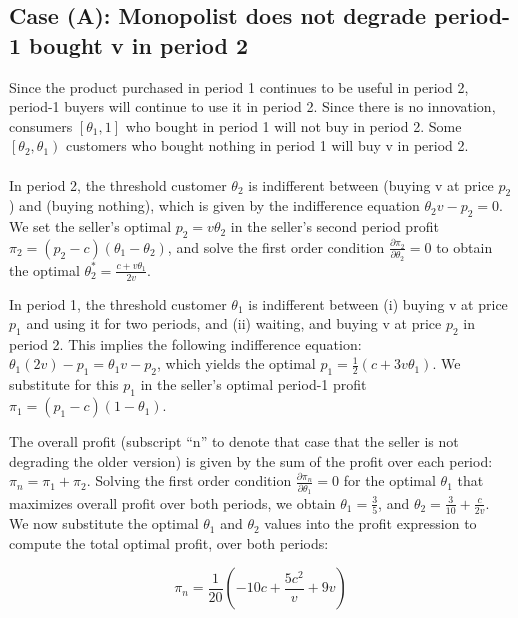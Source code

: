 \documentclass{article}
\begin{document}
\subsection*{Case (A): Monopolist does not degrade period-1 bought v in period 2}

Since the product purchased in period 1 continues to be useful in period 2, period-1 buyers will continue to use it in period 2. Since there is no
innovation, consumers \(\left[\theta _1,1\right]\) who bought in period 1 will not buy in period 2. Some \(\left.\left[\theta _2,\theta _1\right.\right)\)
customers who bought nothing in period 1 will buy v in period 2. \\
\\
In period 2, the threshold customer \(\theta _2\) is indifferent between (buying v at price \(p_2\)) and (buying nothing), which is given by the
indifference equation \(\theta _2v-p_2=0\). We set the seller{'}s optimal \(p_2=v \theta _2\) in the seller{'}s second period profit \(\pi _2=\left(p_2-c\right)\left(\theta
_1-\theta _2\right)\), and solve the first order condition \(\frac{\partial \pi _2}{\partial \theta _2}=0\) to obtain the optimal \(\theta _2^*=\frac{c+v
\theta _1}{2 v}\).

In period 1, the threshold customer \(\theta _1\) is indifferent between (i) buying v at price \(p_1\) and using it for two periods, and (ii) waiting,
and buying v at price \(p_2\) in period 2. This implies the following indifference equation: \(\theta _1 (2 v) - p_1 = \theta _1 v - p_2\), which
yields the optimal \(p_1=\frac{1}{2} \left(c+3 v \theta _1\right)\). We substitute for this \(p_1\) in the seller{'}s optimal period-1 profit \(\pi
_1=\left(p_1-c\right)\left(1-\theta _1\right)\). 

The overall profit (subscript {``}n{''} to denote that case that the seller is not degrading the older version) is given by the sum of the profit
over each period: \(\pi _n=\pi _1+\pi _2\). Solving the first order condition \(\frac{\partial \pi _n}{\partial \theta _1}=0\) for the optimal \(\theta
_1\) that maximizes overall profit over both periods, we obtain \(\theta _1=\frac{3}{5}\), and \(\theta _2=\frac{3}{10}+\frac{c}{2 v}\). We now substitute
the optimal \(\theta _1\) and \(\theta _2\) values into the profit expression to compute the total optimal profit, over both periods:

\begin{equation}
\pi _n=\frac{1}{20} \left(-10 c+\frac{5 c^2}{v}+9 v\right)
\end{equation}
\end{document}
